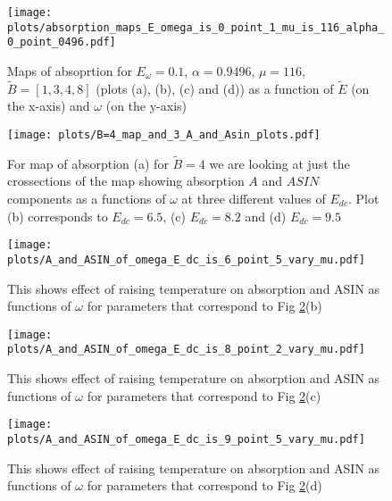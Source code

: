 \documentclass[40pt,letterpaper,physrev]{article}
\begin{document}
	\newpage	
	\begin{figure}[t]
	  \centering
	  \normalsize %
	  \texttt{[image: plots/absorption\_maps\_E\_omega\_is\_0\_point\_1\_mu\_is\_116\_alpha\_0\_point\_0496.pdf]}
	  \caption{Maps of absoprtion for $E_\omega=0.1$, $\alpha=0.9496$, $\mu=116$, $\tilde{B}=[1,3,4,8]$ 
	  (plots (a), (b), (c) and (d)) as a function of $\tilde{E}$ (on the x-axis) and $\omega$ (on the y-axis)}
	  \label{fig:absorption}	  
	\end{figure}	
	\begin{figure}[H]
	  \centering
	  \normalsize %
	  \texttt{[image: plots/B=4\_map\_and\_3\_A\_and\_Asin\_plots.pdf]}
	  \caption{For map of absorption (a) for $\tilde{B}=4$ we are looking at just the crossections of the
	  map showing absorption $A$ and $ASIN$ components as a functions of $\omega$ at three different values of $E_{dc}$.
	  Plot (b) corresponds to $E_{dc}=6.5$, (c) $E_{dc}=8.2$ and (d) $E_{dc}=9.5$}
	  \label{fig:map_of_absorption_and_profiles_for_three_different_E_dc_B=4}
	\end{figure}	
	\newpage	
	\begin{figure}[t]
	  \centering
	  \normalsize %
	  \texttt{[image: plots/A\_and\_ASIN\_of\_omega\_E\_dc\_is\_6\_point\_5\_vary\_mu.pdf]}
	  \caption{This shows effect of raising temperature on absorption and ASIN as functions of $\omega$ for parameters that 
	  correspond to Fig \ref{fig:map_of_absorption_and_profiles_for_three_different_E_dc_B=4}(b)}
	  \label{fig:E_dc=6.5_B=4_different_mu}	  
	\end{figure}	
	\begin{figure}[H]
	  \centering
	  \normalsize %
	  \texttt{[image: plots/A\_and\_ASIN\_of\_omega\_E\_dc\_is\_8\_point\_2\_vary\_mu.pdf]}
	  \caption{This shows effect of raising temperature on absorption and ASIN as functions of $\omega$ for parameters that 
	  correspond to Fig \ref{fig:map_of_absorption_and_profiles_for_three_different_E_dc_B=4}(c)}
	  \label{fig:E_dc=8.2_B=4_different_mu}	  
	\end{figure}
	\newpage
	\begin{figure}[t]
	  \centering
	  \normalsize %
	  \texttt{[image: plots/A\_and\_ASIN\_of\_omega\_E\_dc\_is\_9\_point\_5\_vary\_mu.pdf]}
	  \caption{This shows effect of raising temperature on absorption and ASIN as functions of $\omega$ for parameters that 
	  correspond to Fig \ref{fig:map_of_absorption_and_profiles_for_three_different_E_dc_B=4}(d)}
	  \label{fig:E_dc=9.5_B=4_different_mu}	  
	\end{figure}		
\end{document}
